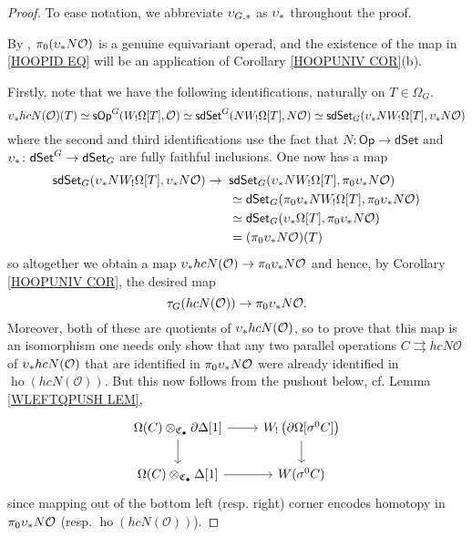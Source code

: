 \documentclass[a4paper,10pt
,draft
]{article}%
\numberwithin{equation}{section}
\numberwithin{figure}{section}
\theoremstyle{definition} %
\newcommand{\dSet}{\mathsf{dSet}}
\renewcommand{\O}{\ensuremath{\mathcal O}}
\newcommand{\1}{\ensuremath{\mathbbm 1}}%
\begin{document}
\begin{proof}
	To ease notation, we abbreviate
	$\upsilon_{G,\**}$ as $\upsilon_{\**}$
	throughout the proof.

      By \cite[Prop. 5.9]{BP_edss}, $\pi_0(\upsilon_{\**}N\O)$ is a genuine equivariant operad,
      and the existence of the map in \eqref{HOOPID EQ}
      will be an application of
      Corollary \ref{HOOPUNIV COR}(b).

Firstly,
note that we have the following identifications,
naturally on $T \in \Omega_G$.
\[
\upsilon_{\**}hcN(\O)(T)
\simeq
\mathsf{sOp}^G(W_!\Omega[T],\O)
\simeq
\mathsf{sdSet}^G(N W_!\Omega[T],N \O)
\simeq 
\mathsf{sdSet}_G(\upsilon_{\**}N W_!\Omega[T],\upsilon_{\**}N \O)
\]
where the second and third identifications use the fact that 
$N\colon \mathsf{Op} \to \mathsf{dSet}$ and $\upsilon_{\**} \colon \dSet^G \to \dSet_G$
are fully faithful inclusions. 
One now has a map
\begin{align*}
  \mathsf{sdSet}_G(\upsilon_{\**}N W_!\Omega[T],\upsilon_{\**}N \O)
  \to \phantom{|} &
    \mathsf{sdSet}_G(\upsilon_{\**}N W_!\Omega[T],\pi_0\upsilon_{\**}N \O)
  \\ & \simeq
       \mathsf{dSet}_G(\pi_0 \upsilon_{\**}  N W_!\Omega[T],\pi_0\upsilon_{\**}N \O)
  \\ & \simeq
       \mathsf{dSet}_G(\upsilon_{\**}\Omega[T],\pi_0\upsilon_{\**}N \O)
  \\ & =
       (\pi_0\upsilon_{\**}N \O)(T)
\end{align*}
so altogether we obtain a map
$\upsilon_{\**}hcN(\O) \to \pi_0 \upsilon_{\**} N \O$
and hence, by Corollary \ref{HOOPUNIV COR},
the desired map 
\[
	\tau_G(hcN(\O)) \to \pi_0 \upsilon_{\**} N \O.
\]
Moreover, both of these are quotients of $\upsilon_{\**}hcN(\O)$,
so to prove that this map is an isomorphism one needs only show that any two parallel operations $C \rightrightarrows hcN \O$ of $\upsilon_{\**}hcN(\O)$
that are identified in 
$\pi_0 \upsilon_{\**} N \O$
were already identified in 
$\mathop{\mathrm{ho}}(hcN(\O))$.
But this now follows from the pushout below,
cf. Lemma \ref{WLEFTQPUSH LEM},
\[
\begin{tikzcd}
	\Omega(C) \otimes_{\mathfrak{C}_{\bullet}}
	\partial \Delta[1]
	\ar{r} \ar{d}
&
	W_! \left(\partial \Omega[\sigma^0 C]\right) 
	\ar{d}
\\
	\Omega(C) \otimes_{\mathfrak{C}_{\bullet}}
	\Delta[1]
	\ar{r}
&
	W(\sigma^0 C)
\end{tikzcd}
\]
since mapping out of the bottom left (resp. right) corner
encodes homotopy in
$\pi_0 \upsilon_{\**} N \O$
(resp. $\mathop{\mathrm{ho}}(hcN(\O))$).
\end{proof}









{}

\end{document}
